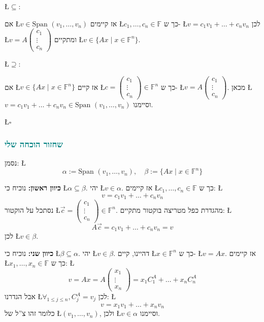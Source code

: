 \documentclass[english,hebrew]{article}
\newcommand{\spn}{\text{Span }}
\begin{document}
\L{$\subseteq$}:

אם \L{$v\in\spn(v_{1},\dots,v_{n})$} אז קיימים \L{$c_{1},\dots,c_{n}\in\mathbb{F}$}
כך ש- \L{$v=c_{1}v_{1}+\dots+c_{n}v_{n}$} לכן \L{$v=A\begin{pmatrix}c_{1}\\
\vdots\\
c_{n}
\end{pmatrix}$} ומתקיים \L{$v\in\{Ax\mid x\in\mathbb{F}^{n}\}$}.

\L{$\supseteq$}:

אם \L{$v\in\{Ax\mid x\in\mathbb{F}^{n}\}$} אז קיים \L{$c=\begin{pmatrix}c_{1}\\
\vdots\\
c_{n}
\end{pmatrix}\in\mathbb{F}^{n}$} כך ש- \L{$v=A\begin{pmatrix}c_{1}\\
\vdots\\
c_{n}
\end{pmatrix}$}. מכאן \L{$v=c_{1}v_{1}+\dots+c_{n}v_{n}\in\spn(v_{1},\dots,v_{n})$}
וסיימנו.
\begin{flushright}
\L{$\square$}
\par\end{flushright}

\subsubsection{\textcolor{teal}{שחזור הוכחה שלי}}

נסמן: \L{%
\[
\alpha:=\spn(v_{1},\dots,v_{n}),\quad\beta:=\{Ax\mid x\in\mathbb{F}^{n}\}
\]
}%

\textbf{כיוון ראשון:} נוכיח כי \L{$\alpha\subseteq\beta$}. יהי \L{$v\in\alpha$}.
אז קיימים \L{$c_{1},\dots,c_{n}\in\mathbb{F}$} כך ש: \L{%
\[
v=c_{1}v_{1}+\dots+c_{n}v_{n}
\]
}%
נסתכל על הוקטור \L{$\vec{c}=\begin{pmatrix}c_{1}\\
\vdots\\
c_{n}
\end{pmatrix}\in\mathbb{F}^{n}$}. מהגדרת כפל מטריצה בוקטור מתקיים: \L{%
\[
A\vec{c}=c_{1}v_{1}+\dots+c_{n}v_{n}=v
\]
}%
לכן \L{$v\in\beta$}.

\textbf{כיוון שני:} נוכיח כי \L{$\beta\subseteq\alpha$}. יהי \L{$v\in\beta$}.
דהיינו, קיים \L{$x\in\mathbb{F}^{n}$} כך ש- \L{$v=Ax$}. אז קיימים
\L{$x_{1},\dots,x_{n}\in\mathbb{F}$} כך ש: \L{%
\[
v=Ax=A\begin{pmatrix}x_{1}\\
\vdots\\
x_{n}
\end{pmatrix}=x_{1}C_{1}^{A}+\dots+x_{n}C_{n}^{A}
\]
}%
אבל הגדרנו \L{$\forall_{1\le j\le n},C_{j}^{A}=v_{j}$} לכן: \L{%
\[
v=x_{1}v_{1}+\dots+x_{n}v_{n}
\]
}%
כלומר זהו צ\textquotedblright ל של \L{$(v_{1},\dots,v_{n})$}, ולכן
\L{$v\in\alpha$} וסיימנו.
\end{document}
